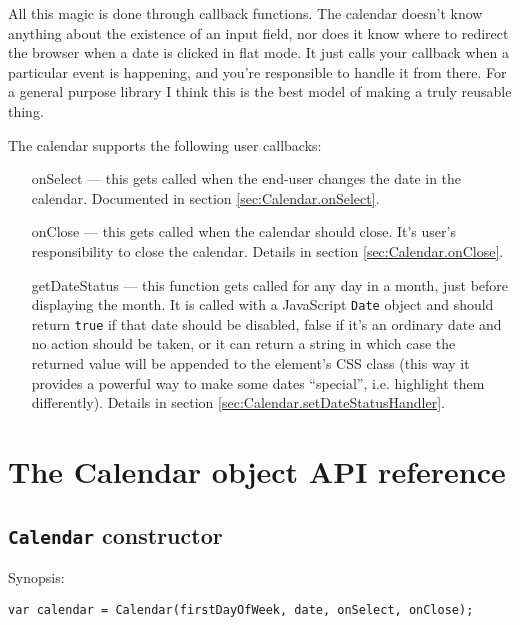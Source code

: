 \documentclass[a4paper,twoside,10pt]{dynadoc}
\begin{document}
All this magic is done through callback functions.  The calendar doesn't know
anything about the existence of an input field, nor does it know where to
redirect the browser when a date is clicked in flat mode.  It just calls your
callback when a particular event is happening, and you're responsible to handle
it from there.  For a general purpose library I think this is the best model of
making a truly reusable thing.

The calendar supports the following user callbacks:

\begin{itemize}

\item [onSelect] --- this gets called when the end-user changes the date in the
calendar.  Documented in section \ref{sec:Calendar.onSelect}.

\item [onClose] --- this gets called when the calendar should close.  It's
user's responsibility to close the calendar.  Details in section
\ref{sec:Calendar.onClose}.

\item [getDateStatus] --- this function gets called for any day in a month,
just before displaying the month.  It is called with a JavaScript \texttt{Date}
object and should return \texttt{true} if that date should be disabled, false
if it's an ordinary date and no action should be taken, or it can return a
string in which case the returned value will be appended to the element's CSS
class (this way it provides a powerful way to make some dates ``special'',
i.e. highlight them differently).  Details in section
\ref{sec:Calendar.setDateStatusHandler}.

\end{itemize}






\section{The Calendar object API reference}\label{sec:Calendar_reference}

\subsection{\texttt{Calendar} constructor}\label{sec:Calendar.constructor}

\noindent Synopsis:

\begin{verbatim}
var calendar = Calendar(firstDayOfWeek, date, onSelect, onClose);
\end{verbatim}
\end{document}

